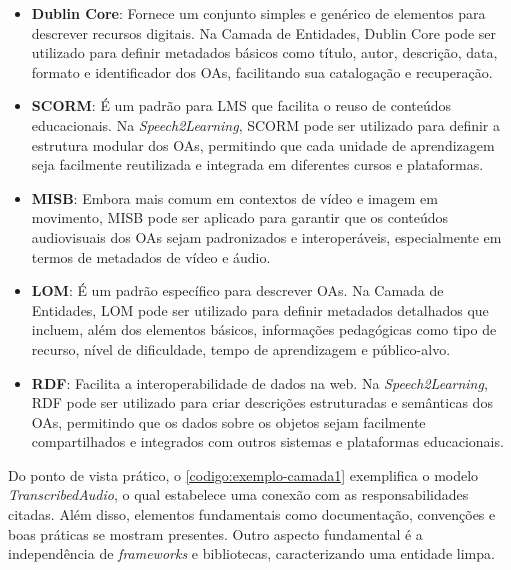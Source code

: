 \begin{itemize}
    \item \textbf{Dublin Core}: Fornece um conjunto simples e genérico de elementos para descrever recursos digitais. Na Camada de Entidades, Dublin Core pode ser utilizado para definir metadados básicos como título, autor, descrição, data, formato e identificador dos OAs, facilitando sua catalogação e recuperação.

    \item \textbf{SCORM}: É um padrão para LMS que facilita o reuso de conteúdos educacionais. Na \textit{Speech2Learning}, SCORM pode ser utilizado para definir a estrutura modular dos OAs, permitindo que cada unidade de aprendizagem seja facilmente reutilizada e integrada em diferentes cursos e plataformas.

    \item \textbf{MISB}: Embora mais comum em contextos de vídeo e imagem em movimento, MISB pode ser aplicado para garantir que os conteúdos audiovisuais dos OAs sejam padronizados e interoperáveis, especialmente em termos de metadados de vídeo e áudio.

    \item \textbf{LOM}: É um padrão específico para descrever OAs. Na Camada de Entidades, LOM pode ser utilizado para definir metadados detalhados que incluem, além dos elementos básicos, informações pedagógicas como tipo de recurso, nível de dificuldade, tempo de aprendizagem e público-alvo.

    \item \textbf{RDF}: Facilita a interoperabilidade de dados na web. Na \textit{Speech2Learning}, RDF pode ser utilizado para criar descrições estruturadas e semânticas dos OAs, permitindo que os dados sobre os objetos sejam facilmente compartilhados e integrados com outros sistemas e plataformas educacionais.
\end{itemize}

Do ponto de vista prático, o \autoref{codigo:exemplo-camada1} exemplifica o modelo \textit{TranscribedAudio}, o qual estabelece uma conexão com as responsabilidades citadas. Além disso, elementos fundamentais como documentação, convenções e boas práticas se mostram presentes. Outro aspecto fundamental é a independência de \textit{frameworks} e bibliotecas, caracterizando uma entidade limpa.

